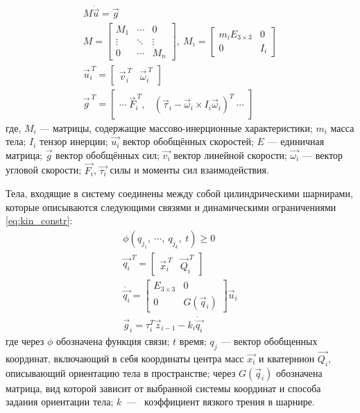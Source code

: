 \begin{align}
    \label{eq:newton_euler}
    M \dot{\vec{u}} = \vec{g} \\
    M = \begin{bmatrix}
    M_1 & \cdots  & 0 \\
    \vdots  & \ddots  & \vdots  \\ 
    0 & \cdots   & M_n 
    \end{bmatrix},\ M_i = \begin{bmatrix}
    m_i E_{3\times 3} & 0 \\ 
    0 & I_i 
    \end{bmatrix} \\
    \vec{u}_i^{\ T} = \begin{bmatrix}
        \vec{v}_i^{\ T} & \vec{\omega}_i^{\ T}
    \end{bmatrix} \\ 
    \vec{g}^{\ T} = \begin{bmatrix}
        \cdots \  \vec{F}_i^{\ T}, & (\vec{\tau}_i - \vec{\omega}_i \times I_i \vec{\omega}_i)^T\  \cdots 
    \end{bmatrix}
\end{align}
где, $M_i$ --- матрицы, содержащие массово-инерционные характеристики; $m_i$ масса тела; $I_i$ тензор инерции; $\vec{u_i}$ вектор обобщённых скоростей; $E$ --- единичная матрица; $\vec{g}$ вектор обобщённых сил; $\vec{v_i}$ вектор линейной скорости; $\vec{\omega_i}$ --- вектор угловой скорости; $\vec{F_i}$, $\vec{\tau_i}$ силы и моменты сил взаимодействия.

Тела, входящие в систему соединены между собой цилиндрическими шарнирами, которые описываются следующими связями и динамическими ограничениями \eqref{eq:kin_constr}:
\begin{align}
    \label{eq:kin_constr}
    \phi(q_{j_1},\ \cdots,\ q_{j_k},\ t) \geqslant  0 \\
    \vec{q_i}^{\ T} = \begin{bmatrix}
        \vec{x}_i^{\ T} & \vec{Q}_i^{\ T}
    \end{bmatrix} \\
    \dot{\vec{q_i}} = \begin{bmatrix}
    E_{3\times3} & 0\\ 
    0 & G(\vec{q}_i) 
    \end{bmatrix}\vec{u}_i  \\
    \vec{g}_i = \tau_i^T \vec{z}_{i-1} -k_i \dot{\vec{q_i}}
\end{align}
где через $\phi$ обозначена функция связи; $t$ время; $q_{j}$ --- вектор обобщенных координат, включающий в себя координаты центра масс $\vec{x_i}$ и кватернион $\vec{Q_i}$, описывающий ориентацию тела в пространстве; через $G(\vec{q}_i)$ обозначена матрица, вид которой зависит от выбранной системы координат и способа задания ориентации тела; $k$~---~ коэффициент вязкого трения в шарнире.

